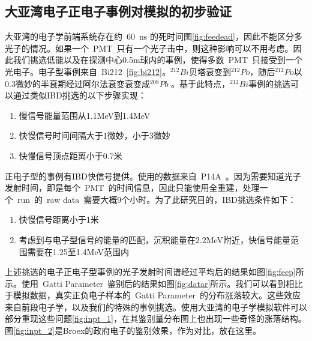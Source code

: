 \subsection{大亚湾电子正电子事例对模拟的初步验证}
大亚湾的电子学前端系统存在约~60~ns 的死时间图\ref{fig:feedead}，因此不能区分多光子的情况。如果一个~PMT~只有一个光子击中，则这种影响可以不用考虑。因此我们挑选低能以及在探测中心0.5m球内的事例，使得多数~PMT~只接受到一个光电子。电子型事例来自~Bi212~\ref{fig:bi212}。$^{212}Bi$贝塔衰变到$^{212}Po$，随后$^{212}Po$以0.3微妙的半衰期经过阿尔法衰变衰变成$^{208}Pb$ 。基于此特点，$^{212}Bi$事例的挑选可以通过类似IBD挑选的以下步骤实现：
\begin{enumerate}
\item 慢信号能量范围从1.1MeV到1.4MeV
\item 快慢信号时间间隔大于1微妙，小于3微妙
\item 快慢信号顶点距离小于0.7米
\end{enumerate}

正电子型的事例有IBD快信号提供。使用的数据来自~P14A~。因为需要知道光子发射时间，即是每个~PMT~的时间信息，因此只能使用全重建，处理一个~run~的~raw data~需要大概9个小时。为了此研究目的，IBD挑选条件如下：
\begin{enumerate}
\item 快慢信号距离小于1米
\item 考虑到与电子型信号的能量的匹配，沉积能量在2.2MeV附近，快信号能量范围需要在1.25至1.4MeV范围内
\end{enumerate}
上述挑选的电子正电子型事例的光子发射时间谱经过平均后的结果如图\ref{fig:feep}所示。使用~Gatti Parameter~鉴别后的结果如图\ref{fig:datar}所示。我们可以看到相比于模拟数据，真实正负电子样本的~Gatti Parameter~的分布涨落较大。这些效应来自前段电子学，以及我们的特殊的事例挑选。使用大亚湾的电子学模拟软件可以部分重现这些问题\ref{fig:inpt_1}，在其鉴别量分布图上也出现一些奇怪的涨落结构。图\ref{fig:inpt_2}是Broex的政府电子的鉴别效果，作为对比，放在这里。

